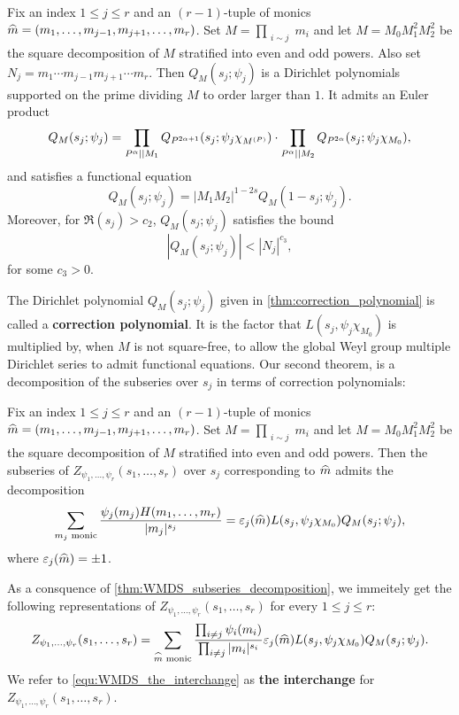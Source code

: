     \begin{theorem}\label{thm:correction_polynomial}
        Fix an index $1 \le j \le r$ and an $(r-1)$-tuple of monics $\widehat{m} = (m_{1},\ldots,m_{j-1},m_{j+1},\ldots,m_{r})$. Set $M = \prod_{\substack{i \sim j}}m_{i}$ and let $M = M_{0}M_{1}^{2}M_{2}^{2}$ be the square decomposition of $M$ stratified into even and odd powers. Also set $N_{j} = m_{1} \cdots m_{j-1}m_{j+1} \cdots m_{r}$. Then $Q_{M}(s_{j};\psi_{j})$ is a Dirichlet polynomials supported on the prime dividing $M$ to order larger than $1$. It admits an Euler product
        \[
            Q_{M}(s_{j};\psi_{j}) = \prod_{P^{\alpha} \mid\mid M_{1}}Q_{P^{2\alpha+1}}(s_{j};\psi_{j}\chi_{M^{(P)}}) \cdot \prod_{P^{\alpha} \mid\mid M_{2}}Q_{P^{2\alpha}}(s_{j};\psi_{j}\chi_{M_{0}}),
        \]
        and satisfies a functional equation
        \[
            Q_{M}(s_{j};\psi_{j}) = |M_{1}M_{2}|^{1-2s}Q_{M}(1-s_{j};\psi_{j}).
        \]
        Moreover, for $\Re(s_{j}) > c_{2}$, $Q_{M}(s_{j};\psi_{j})$ satisfies the bound
        \[
            |Q_{M}(s_{j};\psi_{j})| < |N_{j}|^{c_{3}},
        \]
        for some $c_{3} > 0$.
    \end{theorem}

    The Dirichlet polynomial $Q_{M}(s_{j};\psi_{j})$ given in \cref{thm:correction_polynomial} is called a \textbf{correction polynomial}. It is the factor that $L(s_{j},\psi_{j}\chi_{M_{0}})$ is multiplied by, when $M$ is not square-free, to allow the global Weyl group multiple Dirichlet series to admit functional equations. Our second theorem, is a decomposition of the subseries over $s_{j}$ in terms of correction polynomials:

    \begin{theorem}\label{thm:WMDS_subseries_decomposition}
        Fix an index $1 \le j \le r$ and an $(r-1)$-tuple of monics $\widehat{m} = (m_{1},\ldots,m_{j-1},m_{j+1},\ldots,m_{r})$. Set $M = \prod_{\substack{i \sim j}}m_{i}$ and let $M = M_{0}M_{1}^{2}M_{2}^{2}$ be the square decomposition of $M$ stratified into even and odd powers. Then the subseries of $Z_{\psi_{1},\ldots,\psi_{r}}(s_{1},\ldots,s_{r})$ over $s_{j}$ corresponding to $\widehat{m}$ admits the decomposition
        \[
            \sum_{\text{$m_{j}$ monic}}\frac{\psi_{j}(m_{j})H(m_{1},\ldots,m_{r})}{|m_{j}|^{s_{j}}} = \varepsilon_{j}(\widehat{m})L(s_{j},\psi_{j}\chi_{M_{0}})Q_{M}(s_{j};\psi_{j}),
        \]
        where $\varepsilon_{j}(\widehat{m}) = \pm1$.
    \end{theorem}

    As a consquence of \cref{thm:WMDS_subseries_decomposition}, we immeitely get the following representations of $Z_{\psi_{1},\ldots,\psi_{r}}(s_{1},\ldots,s_{r})$ for every $1 \le j \le r$:
    \begin{equation}\label{equ:WMDS_the_interchange}
        Z_{\psi_{1},\ldots,\psi_{r}}(s_{1},\ldots,s_{r}) = \sum_{\text{$\widehat{m}$ monic}}\frac{\prod_{i \neq j}\psi_{i}(m_{i})}{\prod_{i \neq j}|m_{i}|^{s_{i}}}\varepsilon_{j}(\widehat{m})L(s_{j},\psi_{j}\chi_{M_{0}})Q_{M}(s_{j};\psi_{j}).
    \end{equation}
    We refer to \cref{equ:WMDS_the_interchange} as \textbf{the interchange} for $Z_{\psi_{1},\ldots,\psi_{r}}(s_{1},\ldots,s_{r})$. 
